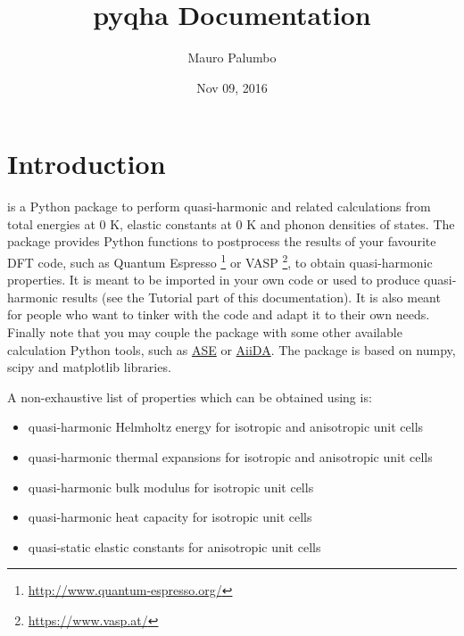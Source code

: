 \documentclass[letterpaper,10pt,english]{sphinxmanual}
\title{pyqha Documentation}
\date{Nov 09, 2016}
\author{Mauro Palumbo}
\begin{document}
\maketitle
\tableofcontents
{}\label{index::doc}



\chapter{Introduction}
\label{introduction:introduction}\label{introduction:welcome-to-pyqha-s-documentation}\label{introduction::doc}\label{introduction:id1}
 is a Python package to perform quasi-harmonic and related calculations from total energies at 0 K, elastic constants at 0 K and phonon densities of states. The package provides Python functions to postprocess the results of your favourite DFT code, such as Quantum Espresso \footnote[1]{\sphinxAtStartFootnote
\url{http://www.quantum-espresso.org/}
} or VASP \footnote[2]{\sphinxAtStartFootnote
\url{https://www.vasp.at/}
}, to obtain quasi-harmonic properties. It is meant to be imported in your own code or used to produce quasi-harmonic results (see the Tutorial part of this documentation). It is also meant for people who want to tinker with the code and adapt it to their own needs. Finally note that you may couple the package with some other available calculation Python tools, such as \href{https://wiki.fysik.dtu.dk/ase/about.html}{ASE} or \href{http://www.aiida.net/}{AiiDA}.
The package is based on numpy, scipy and matplotlib libraries.

A non-exhaustive list of properties which can be obtained using  is:
\begin{itemize}
\item {} 
quasi-harmonic Helmholtz energy for isotropic and anisotropic unit cells

\item {} 
quasi-harmonic thermal expansions for isotropic and anisotropic unit cells

\item {} 
quasi-harmonic bulk modulus for isotropic unit cells

\item {} 
quasi-harmonic heat capacity for isotropic unit cells

\item {} 
quasi-static elastic constants for anisotropic unit cells

\end{itemize}
\end{document}

